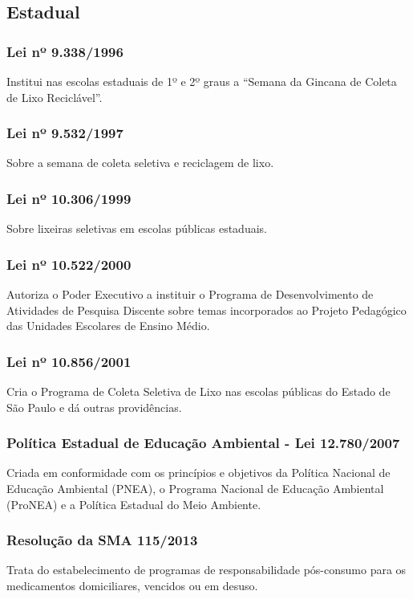 \begin{subapend}
	\subsection{Estadual}
	\begin{subsubapend}
		\item \subsubsection{Lei nº 9.338/1996}
		Institui nas escolas estaduais de 1º e 2º graus a “Semana da Gincana de Coleta de Lixo Reciclável”.
		\subsubsection{Lei nº 9.532/1997}
		Sobre a semana de coleta seletiva e reciclagem de lixo.
		\subsubsection{Lei nº 10.306/1999}
		Sobre lixeiras seletivas em escolas públicas estaduais.
		\subsubsection{Lei nº 10.522/2000}
		Autoriza o Poder Executivo a instituir o Programa de Desenvolvimento de Atividades de Pesquisa Discente sobre temas incorporados ao Projeto Pedagógico das Unidades Escolares de Ensino Médio.
		\subsubsection{Lei nº 10.856/2001}
		Cria o Programa de Coleta Seletiva de Lixo nas escolas públicas do Estado de São Paulo e dá outras providências.
		\subsubsection{Política Estadual de Educação Ambiental - Lei 12.780/2007}
		Criada em conformidade com os princípios e objetivos da Política Nacional de Educação Ambiental (PNEA), o Programa Nacional de Educação Ambiental (ProNEA) e a Política Estadual do Meio Ambiente.
		\subsubsection{Resolução da SMA 115/2013}
		Trata do estabelecimento de programas de responsabilidade pós-consumo para os medicamentos domiciliares, vencidos ou em desuso.
	\end{subsubapend}
\end{subapend}

